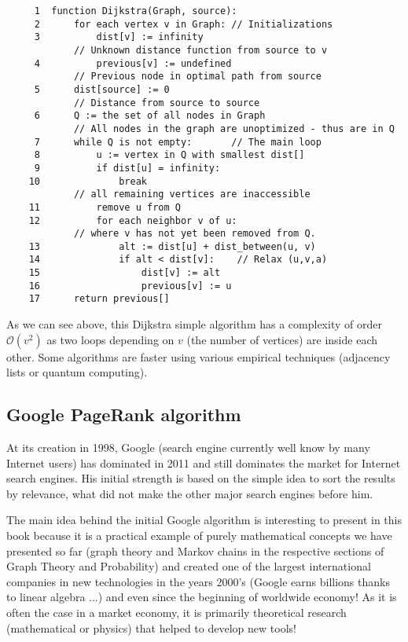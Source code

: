 	\begin{verbatim}
	 1  function Dijkstra(Graph, source):
	 2      for each vertex v in Graph: // Initializations
	 3          dist[v] := infinity     
	        // Unknown distance function from source to v
	 4          previous[v] := undefined
	        // Previous node in optimal path from source
	 5      dist[source] := 0           
	        // Distance from source to source
	 6      Q := the set of all nodes in Graph
	        // All nodes in the graph are unoptimized - thus are in Q
	 7      while Q is not empty:       // The main loop
	 8          u := vertex in Q with smallest dist[]
	 9          if dist[u] = infinity:
	10              break               
	        // all remaining vertices are inaccessible
	11          remove u from Q
	12          for each neighbor v of u:
	        // where v has not yet been removed from Q.
	13              alt := dist[u] + dist_between(u, v) 
	14              if alt < dist[v]:    // Relax (u,v,a)
	15                  dist[v] := alt
	16                  previous[v] := u
	17      return previous[]
	\end{verbatim}
	As we can see above, this Dijkstra simple algorithm has a complexity of order $\mathcal{O}(v^2)$ as two loops depending on $v$ (the number of vertices) are inside each other. Some algorithms are faster using various empirical techniques (adjacency lists or quantum computing).	
	
	\subsection{Google PageRank algorithm}
	At its creation in 1998, Google (search engine currently well know by many Internet users) has dominated in 2011 and still dominates the market for Internet search engines. His initial strength is based on the simple idea to sort the results by relevance, what did not make the other major search engines before him.
	
	The main idea behind the initial Google algorithm is interesting to present in this book because it is a practical example of purely mathematical concepts we have presented so far (graph theory and Markov chains in the respective sections of Graph Theory and Probability) and created one of the largest international companies in new technologies in the years 2000's (Google earns billions thanks to linear algebra ...) and even since the beginning of worldwide economy! As it is often the case in a market economy, it is primarily theoretical research (mathematical or physics) that helped to develop new tools!
	
